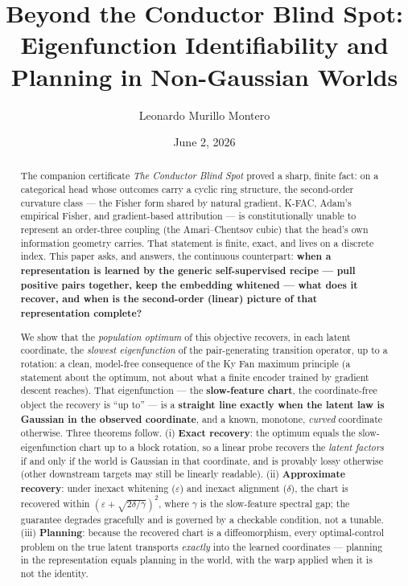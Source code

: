 \documentclass[
  letterpaper,
  11pt]{article}
\title{Beyond the Conductor Blind Spot: Eigenfunction Identifiability and Planning in Non-Gaussian Worlds}
\author{Leonardo Murillo Montero}
\date{June 2, 2026}
\theoremstyle{plain}
\theoremstyle{definition}
\theoremstyle{remark}
\begin{document}
\maketitle
\begin{abstract}
The companion certificate \emph{The Conductor Blind Spot} proved a sharp, finite fact: on a categorical head whose outcomes carry a cyclic ring structure, the second-order curvature class --- the Fisher form shared by natural gradient, K-FAC, Adam's empirical Fisher, and gradient-based attribution --- is constitutionally unable to represent an order-three coupling (the Amari--Chentsov cubic) that the head's own information geometry carries. That statement is finite, exact, and lives on a discrete index. This paper asks, and answers, the continuous counterpart: \textbf{when a representation is learned by the generic self-supervised recipe --- pull positive pairs together, keep the embedding whitened --- what does it recover, and when is the second-order (linear) picture of that representation complete?}

We show that the \emph{population optimum} of this objective recovers, in each latent coordinate, the \emph{slowest eigenfunction} of the pair-generating transition operator, up to a rotation: a clean, model-free consequence of the Ky Fan maximum principle (a statement about the optimum, not about what a finite encoder trained by gradient descent reaches). That eigenfunction --- the \textbf{slow-feature chart}, the coordinate-free object the recovery is ``up to'' --- is a \textbf{straight line exactly when the latent law is Gaussian in the observed coordinate}, and a known, monotone, \emph{curved} coordinate otherwise. Three theorems follow. (i) \textbf{Exact recovery}: the optimum equals the slow-eigenfunction chart up to a block rotation, so a linear probe recovers the \emph{latent factors} if and only if the world is Gaussian in that coordinate, and is provably lossy otherwise (other downstream targets may still be linearly readable). (ii) \textbf{Approximate recovery}: under inexact whitening (\(\varepsilon\)) and inexact alignment (\(\delta\)), the chart is recovered within \((\varepsilon+\sqrt{2\delta/\gamma})^2\), where \(\gamma\) is the slow-feature spectral gap; the guarantee degrades gracefully and is governed by a checkable condition, not a tunable. (iii) \textbf{Planning}: because the recovered chart is a diffeomorphism, every optimal-control problem on the true latent transports \emph{exactly} into the learned coordinates --- planning in the representation equals planning in the world, with the warp applied when it is not the identity.


\end{abstract}
\end{document}
